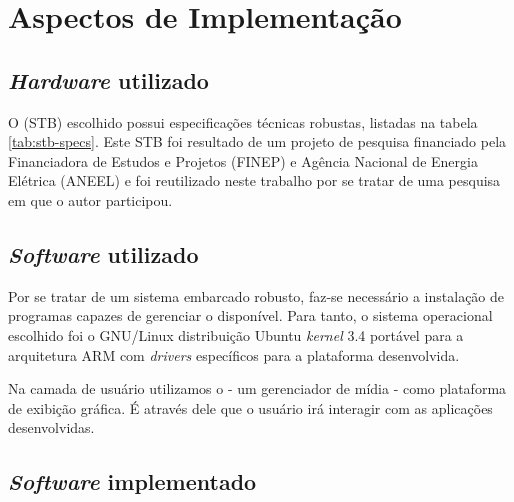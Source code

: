 \chapter{Aspectos de Implementação}


\section{\textit{Hardware} utilizado}\label{sec:hardware-utilizado}

O \stb[] (STB) escolhido possui especificações técnicas robustas, listadas na 
tabela \ref{tab:stb-specs}. Este STB foi resultado de um projeto de pesquisa
financiado pela Financiadora de Estudos e Projetos (FINEP) e Agência Nacional
de Energia Elétrica (ANEEL) e foi reutilizado neste trabalho por se tratar de 
uma pesquisa em que o autor participou.



\section{\textit{Software} utilizado}\label{sec:software-utilizado}

Por se tratar de um sistema embarcado robusto, faz-se necessário a instalação
de programas capazes de gerenciar o \hardware[] disponível. Para tanto, o
sistema operacional escolhido foi o GNU/Linux distribuição Ubuntu 
\textit{kernel} 3.4 portável para a arquitetura ARM com \textit{drivers} 
específicos para a plataforma desenvolvida.



Na camada de usuário utilizamos o \software[] \xbmc[] - um gerenciador de mídia
- como plataforma de exibição gráfica. É através dele que o usuário irá 
interagir com as aplicações desenvolvidas.

\section{\textit{Software} implementado}\label{sec:software-implementado}

